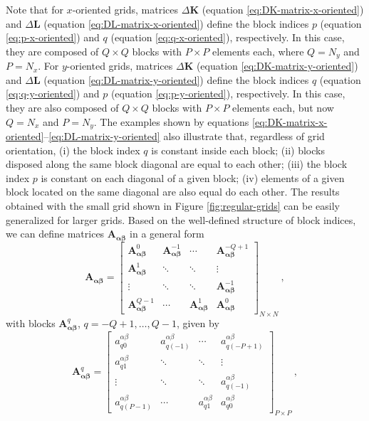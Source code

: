 \documentclass[manuscript]{geophysics}
\begin{document}
Note that for $x$-oriented grids, matrices $\Delta\mathbf{K}$ (equation \ref{eq:DK-matrix-x-oriented})
and $\Delta\mathbf{L}$ (equation \ref{eq:DL-matrix-x-oriented}) define the block indices
$p$ (equation \ref{eq:p-x-oriented}) and $q$ (equation \ref{eq:q-x-oriented}), respectively.
In this case, they are composed of $Q \times Q$ blocks with $P \times P$ elements each, where 
$Q = N_{y}$ and $P = N_{x}$. 
For $y$-oriented grids, matrices $\Delta\mathbf{K}$ (equation \ref{eq:DK-matrix-y-oriented})
and $\Delta\mathbf{L}$ (equation \ref{eq:DL-matrix-y-oriented}) define the block indices
$q$ (equation \ref{eq:q-y-oriented}) and $p$ (equation \ref{eq:p-y-oriented}), respectively.
In this case, they are also composed of $Q \times Q$ blocks with $P \times P$ elements each, 
but now $Q = N_{x}$ and $P = N_{y}$.
The examples shown by equations \ref{eq:DK-matrix-x-oriented}--\ref{eq:DL-matrix-y-oriented}
also illustrate that, regardless of grid orientation, (i) the block index $q$ is constant 
inside each block; (ii) blocks disposed along the same block diagonal are equal to each other; 
(iii) the block index $p$ is constant on each diagonal of a given block; 
(iv) elements of a given block located on the same diagonal are also equal do each other.
The results obtained with the small grid shown in Figure \ref{fig:regular-grids}
can be easily generalized for larger grids.
Based on the well-defined structure of block indices, we can define 
matrices $\mathbf{A_{\boldsymbol{\alpha\beta}}}$ in a general form
\begin{equation}
	\mathbf{A}_{\boldsymbol{\alpha\beta}} = \begin{bmatrix}
		\mathbf{A}_{\boldsymbol{\alpha\beta}}^{0}   & \mathbf{A}_{\boldsymbol{\alpha\beta}}^{-1} & \cdots          & \mathbf{A}_{\boldsymbol{\alpha\beta}}^{-Q+1} \\
		\mathbf{A}_{\boldsymbol{\alpha\beta}}^{1}   & \ddots          & \ddots          & \vdots           \\ 
		\vdots           & \ddots          & \ddots          & \mathbf{A}_{\boldsymbol{\alpha\beta}}^{-1}   \\
		\mathbf{A}_{\boldsymbol{\alpha\beta}}^{Q-1} & \cdots          & \mathbf{A}_{\boldsymbol{\alpha\beta}}^{1}  & \mathbf{A}_{\boldsymbol{\alpha\beta}}^{0}
	\end{bmatrix}_{N \times N} \: ,
	\label{eq:BTTB_A_alpha_beta}
\end{equation}
with blocks $\mathbf{A}_{\boldsymbol{\alpha\beta}}^{q}$, $q = -Q+1, \dots, Q-1$, given by
\begin{equation}
	\mathbf{A}_{\boldsymbol{\alpha\beta}}^{q} = \begin{bmatrix}
		a^{\alpha\beta}_{q0}   & a^{\alpha\beta}_{q(-1)} & \cdots  & a^{\alpha\beta}_{q(-P+1)} \\
		a^{\alpha\beta}_{q1}   & \ddots     & \ddots  & \vdots       \\ 
		\vdots      & \ddots     & \ddots  & a^{\alpha\beta}_{q(-1)}   \\
		a^{\alpha\beta}_{q(P-1)} & \cdots     & a^{\alpha\beta}_{q1}  & a^{\alpha\beta}_{q0}
	\end{bmatrix}_{P \times P} \: ,
	\label{eq:Aq_block}
\end{equation}
\end{document}
